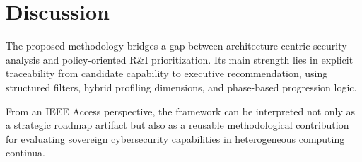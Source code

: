 \section{Discussion}

The proposed methodology bridges a gap between architecture-centric security analysis and policy-oriented R\&I prioritization. Its main strength lies in explicit traceability from candidate capability to executive recommendation, using structured filters, hybrid profiling dimensions, and phase-based progression logic.

From an IEEE Access perspective, the framework can be interpreted not only as a strategic roadmap artifact but also as a reusable methodological contribution for evaluating sovereign cybersecurity capabilities in heterogeneous computing continua.